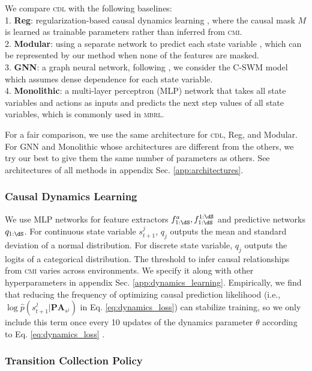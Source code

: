 We compare \textsc{cdl} with the following baselines:\\
1. \textbf{Reg}: regularization-based causal dynamics learning \cite{wang2021task}, where the causal mask $M$ is learned as trainable parameters rather than inferred from \textsc{cmi}.\\
2. \textbf{Modular}: using a separate network to predict each state variable \cite{ke2021systematic}, which can be represented by our method when none of the features are masked.\\
3. \textbf{GNN}: a graph neural network, following \cite{ke2021systematic}, we consider the C-SWM model \cite{kipf2019contrastive} which assumes dense dependence for each state variable.\\
4. \textbf{Monolithic}: a multi-layer perceptron (MLP) network that takes all state variables and actions as inputs and predicts the next step values of all state variables, which is commonly used in \textsc{mbrl}.

For a fair comparison, we use the same architecture for \textsc{cdl}, Reg, and Modular. For GNN and Monolithic whose architectures are different from the others, we try our best to give them the same number of parameters as others. See architectures of all methods in appendix Sec. \ref{app:architectures}.

\subsubsection{Causal Dynamics Learning}

We use MLP networks for feature extractors $f^a_{1:\dS}, f^{ 1:\dS}_{1:\dS}$ and predictive networks $q_{1:\dS}$. For continuous state variable $s^j_{t+1}$, $q_j$ outputs the mean and standard deviation of a normal distribution. For discrete state variable, $q_j$ outputs the logits of a categorical distribution. The threshold to infer causal relationships from \textsc{cmi} varies across environments.  We specify it along with other hyperparameters in appendix Sec. \ref{app:dynamics_learning}. Empirically, we find that reducing the frequency of optimizing causal prediction likelihood (i.e., $\log\hat{p}(s^j_{t+1} | \textbf{PA}_{s^j})$ in Eq. \ref{eq:dynamics_loss}) can stabilize training, so we only include this term once every 10 updates of the dynamics parameter $\theta$ according to Eq. \ref{eq:dynamics_loss} .

\subsubsection{Transition Collection Policy}

